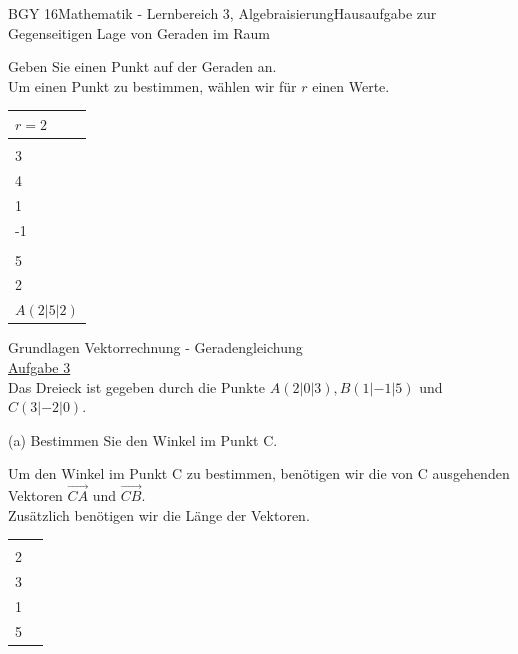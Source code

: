 \documentclass[oneside,openany,headings=optiontotoc,11pt,numbers=noenddot]{scrreprt}
\begin{document}
\begin{worksheet}{BGY 16}{Mathematik - Lernbereich 3, Algebraisierung}{Hausaufgabe zur Gegenseitigen Lage von Geraden im Raum}
\begin{framed}
			Geben Sie einen Punkt auf der Geraden an. \\
			Um einen Punkt zu bestimmen, wählen wir für \(r\) einen Werte.\\
			\par\bigskip\noindent
			\begin{tabularx}{\textwidth}{X}
				\(r=2\)\\
				\hline
				\(\vec{x} = \left(\begin{array}{c}2\\3\\4\end{array}\right) + 2*\left(\begin{array}{c}0\\1\\-1\end{array}\right)\) \\
				\(\vec{x} = \left(\begin{array}{c}2\\5\\2\end{array}\right)\)\\
				\underline{\(A(2|5|2)\)}
			\end{tabularx}
		\end{framed}
		\begin{framed}
			\noindent
			\tiny{\color{codegray}Grundlagen Vektorrechnung - Geradengleichung}\\
			\normalsize\normalcolor
			\underline{Aufgabe 3}\\
			Das Dreieck ist gegeben durch die Punkte \(A(2|0|3), B(1|-1|5)\) und \(C(3|-2|0)\).\\
			\par\bigskip\noindent
			(a) Bestimmen Sie den Winkel im Punkt C.\\
			\par\noindent
			Um den Winkel im Punkt C zu bestimmen, benötigen wir die von C ausgehenden Vektoren \(\vec{CA}\) und \(\vec{CB}\).\\
			Zusätzlich benötigen wir die Länge der Vektoren.\\
			\begin{tabularx}{\textwidth}{XX}
				\(\vec{CA} = \vec{A} - \vec{C} = \left(\begin{array}{c}-1\\2\\3\end{array}\right)\) & \(\vec{CB} = \vec{B} - \vec{C} = \left(\begin{array}{c}-2\\1\\5\end{array}\right)\)\\

\end{tabularx}
\end{framed}
\end{worksheet}
\end{document}
